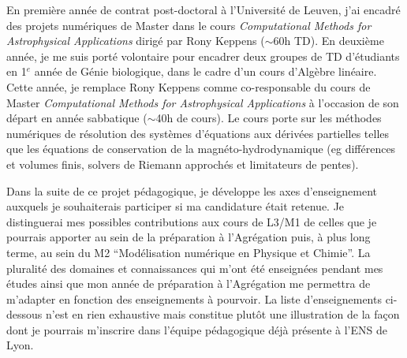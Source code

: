 \documentclass[11pt,onecolumn]{article}
\begin{document}
En première année de contrat post-doctoral à l’Université de Leuven, j’ai encadré des projets numériques de Master dans le cours \textit{Computational Methods for Astrophysical Applications} dirigé par Rony Keppens ($\sim$60h TD). En deuxième année, je me suis porté volontaire pour encadrer deux groupes de TD d'étudiants en 1$^{e}$ année de Génie biologique, dans le cadre d'un cours d'Algèbre linéaire. Cette année, je remplace Rony Keppens comme co-responsable du cours de Master \textit{Computational Methods for Astrophysical Applications} à l'occasion de son départ en année sabbatique ($\sim$40h de cours). Le cours porte sur les méthodes numériques de résolution des systèmes d’équations aux dérivées partielles telles que les équations de conservation de la magnéto-hydrodynamique (eg différences et volumes finis, solvers de Riemann approchés et limitateurs de pentes).

Dans la suite de ce projet pédagogique, je développe les axes d’enseignement auxquels je souhaiterais participer si ma candidature était retenue. Je distinguerai mes possibles contributions aux cours de L3/M1 de celles que je pourrais apporter au sein de la préparation à l’Agrégation puis, à plus long terme, au sein du M2 “Modélisation numérique en Physique et Chimie”. La pluralité des domaines et connaissances qui m’ont été enseignées pendant mes études ainsi que mon année de préparation à l’Agrégation me permettra de m’adapter en fonction des enseignements à pourvoir. La liste d’enseignements ci-dessous n’est en rien exhaustive mais constitue plutôt une illustration de la façon dont je pourrais m’inscrire dans l’équipe pédagogique déjà présente à l’ENS de Lyon.\\

\vspace*{0.2cm}

\small
\end{document}
